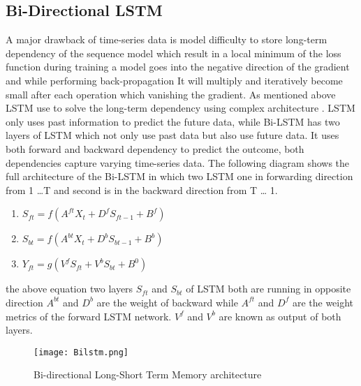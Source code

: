 \subsection{ Bi-Directional LSTM}
A major drawback of  time-series data is model difficulty to store long-term dependency of the sequence model which result in a local minimum of the loss function during training a model goes into the negative direction of the gradient and while performing back-propagation  
It will multiply and iteratively become small after each operation which vanishing the gradient. As mentioned above LSTM use to solve the long-term dependency using complex architecture \cite{sundermeyer2012lstm}. LSTM only uses past information to predict the future data, while Bi-LSTM has two layers of LSTM which not only use past data but also use future data. It uses both forward and backward dependency to predict the outcome, both dependencies capture varying time-series data. The following diagram shows the full architecture of the Bi-LSTM in which two LSTM one in forwarding direction from 1 …T and second is in the backward direction from T … 1.
\begin{enumerate}
\item \(S_{ft}=f(A^{ft} X_{t} + D^{f} S_{ft-1} + B^{f} )\)
\item \(S_{bt}=f(A^{bt} X_{t} + D^{b} S_{bt-1} + B^{b} )\)
\item \(Y_{ft}=g(V^{f} S_{ft}+V^{b} S_{bt}+B ^{0})\)
\end{enumerate}
the above equation two layers $S_{ft}$ and $S_{bt}$ of LSTM both are running in opposite direction $A^{bt}$ and $D^{b}$ are the weight of backward while $A^{ft}$ and $D^{f}$ are the weight metrics of the forward LSTM network. $V^{f}$ and $V^{b}$ are known as output of both layers.
\begin{figure}
      \texttt{[image: Bilstm.png]}
  \caption{Bi-directional Long-Short Term Memory architecture}
  \label{fig:bilstm}
\end{figure}

